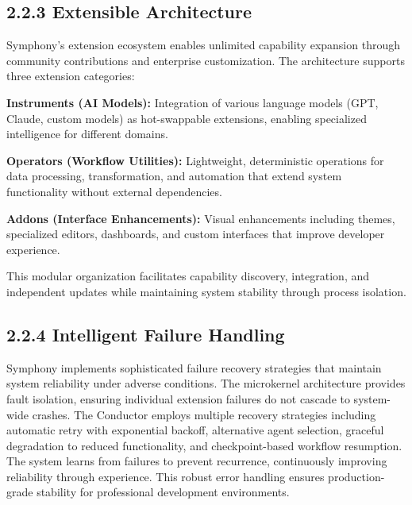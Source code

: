 \subsection*{2.2.3 Extensible Architecture}

Symphony's extension ecosystem enables unlimited capability expansion through community contributions and enterprise customization. The architecture supports three extension categories:

\textbf{Instruments (AI Models):} Integration of various language models (GPT, Claude, custom models) as hot-swappable extensions, enabling specialized intelligence for different domains.

\textbf{Operators (Workflow Utilities):} Lightweight, deterministic operations for data processing, transformation, and automation that extend system functionality without external dependencies.

\textbf{Addons (Interface Enhancements):} Visual enhancements including themes, specialized editors, dashboards, and custom interfaces that improve developer experience.

This modular organization facilitates capability discovery, integration, and independent updates while maintaining system stability through process isolation.


\subsection*{2.2.4 Intelligent Failure Handling}

Symphony implements sophisticated failure recovery strategies that maintain system reliability under adverse conditions. The microkernel architecture provides fault isolation, ensuring individual extension failures do not cascade to system-wide crashes. The Conductor employs multiple recovery strategies including automatic retry with exponential backoff, alternative agent selection, graceful degradation to reduced functionality, and checkpoint-based workflow resumption. The system learns from failures to prevent recurrence, continuously improving reliability through experience. This robust error handling ensures production-grade stability for professional development environments.
